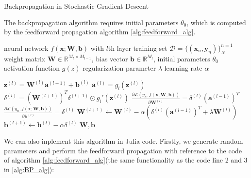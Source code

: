 \documentclass[
	parskip, 			   %
	twoside, 			   %
	DIV=14, 			   %
	BCOR=15.0mm, 		   %
	headsepline, 		   %
	open=right, 		   %
	captions=tableheading, %
	bibliography=totoc,    %
	numbers=noenddot       %
]{scrreprt}
\begin{document}
\clearpage
\begin{algorithm}[h!]
\caption{Backpropagation in Stochastic Gradient Descent}
The backpropagation algorithm requires initial parameters $\theta_{0}$, which is computed by the feedforward propagation algorithm \ref{alg:feedforward_alg}.
\label{alg:BP_alg}
    \begin{algorithmic}[1]
    \Require neural network $f(\mathbf{x};\mathbf{W},\mathbf{b})$ with $l$th layer
    \Require training set $\mathcal{D}=\{(\mathbf{x}_{n}, \mathbf{y}_{n})\}_{N}^{n=1}$
    \Require weight matrix $\mathbf{W} \in \mathbb{R}^{M_{l} \times M_{l-1}}$, bias vector $\mathbf{b} \in \mathbb{R}^{M_{l}}$, initial parameters $\theta_{0}$
    \Require activation function $g(z)$
    \Require regularization parameter $\lambda$
    \Require learning rate $\alpha$

        \State $\mathbf{z}^{(l)} = \mathbf{W}^{(l)} \mathbf{a}^{(l-1)} + \mathbf{b}^{(l)}$ 
        \State $\mathbf{a}^{(l)} = g_{l}(\mathbf{z}^{(l)})$ 
        \State {}
        \State $\delta^{(l)} = (\mathbf{W}^{(l+1)})^T \delta^{(l+1)} \odot g_{l}'(\mathbf{z}^{(l)})$ 
        \State {}
        \State $\frac{\partial \mathcal{L}\left( y_n,f(\mathbf{x};\mathbf{\mathbf{W},\mathbf{b}}) \right)}{\partial \mathbf{W}^{(l)}} = \delta^{(l)} (\mathbf{a}^{(l-1)})^T$ 
        \State $\frac{\partial \mathcal{L}\left( y_n,f(\mathbf{x};\mathbf{\mathbf{W},\mathbf{b}}) \right)}{\partial \mathbf{b}^{(l)}} = \delta^{(l)}$ 
        \State {}
        \State $\mathbf{W}^{(l+1)} \gets  \mathbf{W}^{(l)}-\alpha (\delta^{(l)} (\mathbf{a}^{(l-1)})^T + \lambda \mathbf{W}^{(l)})$ 
        \State $\mathbf{b}^{(l+1)} \gets  \mathbf{b}^{(l)}-\alpha \delta^{(l)}$ 
        \State {}
    \EndFor
    \State \Return $\mathbf{W}, \mathbf{b}$ 
    \end{algorithmic}
\end{algorithm}

We can also inplement this algorithm in Julia code. Firstly, we generate random parameters and perform the feedforward propagation with reference to the code of algorithm \ref{alg:feedforward_alg}(the same functionality as the code line 2 and 3 in \ref{alg:BP_alg}):
\end{document}
